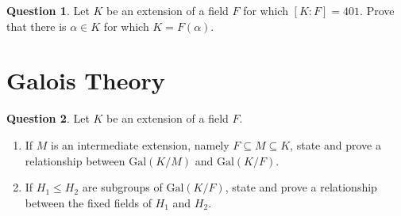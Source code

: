 \documentclass[11pt]{article}
\def\mbb{\mathbb}
\def\R{\mbb{R}}
\theoremstyle{pink}
\theoremstyle{boxedsolution}
\theoremstyle{definition}
\newtheorem{question}{Question}
\theoremstyle{claim}
\newtheorem*{claim}{Claim}
\begin{document}
\begin{question}
    Let $K$ be an extension of a field $F$ for which $[K:F] = 401$. Prove that there is $\alpha \in K$ for which $K = F(\alpha)$.
\end{question}



\newpage

\section*{Galois Theory}

\setcounter{question}{0}

\begin{question}
    Let $K$ be an extension of a field $F$.
    \begin{enumerate}[label=(\alph*)]
        \item If $M$ is an intermediate extension, namely $F \subseteq M \subseteq K$, state and prove a relationship between $\mathrm{Gal}(K/M)$ and $\mathrm{Gal}(K/F)$.

        \item If $H_1 \leq H_2$ are subgroups of $\mathrm{Gal}(K/F)$, state and prove a relationship between the fixed fields of $H_1$ and $H_2$.
    \end{enumerate}
\end{question}
\end{document}
